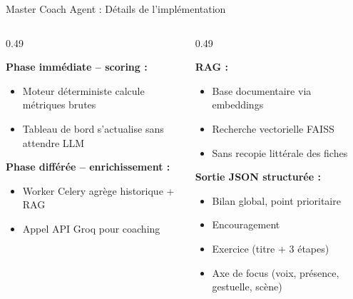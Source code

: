 \documentclass[10pt,aspectratio=169]{beamer}
\begin{document}
\begin{frame}{Master Coach Agent : Détails de l'implémentation}
\begin{columns}[T]
\begin{column}{0.49\textwidth}
\begin{tcolorbox}[title=Flux de génération, colframe=primary, colback=primary!3]
\small
\textbf{Phase immédiate -- scoring :}
\begin{itemize}
    \item Moteur déterministe calcule métriques brutes
    \item Tableau de bord s'actualise sans attendre LLM
\end{itemize}
\textbf{Phase différée -- enrichissement :}
\begin{itemize}
    \item Worker Celery agrège historique + RAG
    \item Appel API Groq pour coaching
\end{itemize}
\end{tcolorbox}
\end{column}
\begin{column}{0.49\textwidth}
\begin{tcolorbox}[title=Intelligence pédagogique, colframe=success, colback=success!3]
\small
\textbf{RAG :}
\begin{itemize}
    \item Base documentaire via embeddings
    \item Recherche vectorielle FAISS
    \item Sans recopie littérale des fiches
\end{itemize}
\textbf{Sortie JSON structurée :}
\begin{itemize}
    \item Bilan global, point prioritaire
    \item Encouragement
    \item Exercice (titre + 3 étapes)
    \item Axe de focus (voix, présence, gestuelle, scène)
\end{itemize}
\end{tcolorbox}
\end{column}
\end{columns}
\end{frame}
\end{document}
